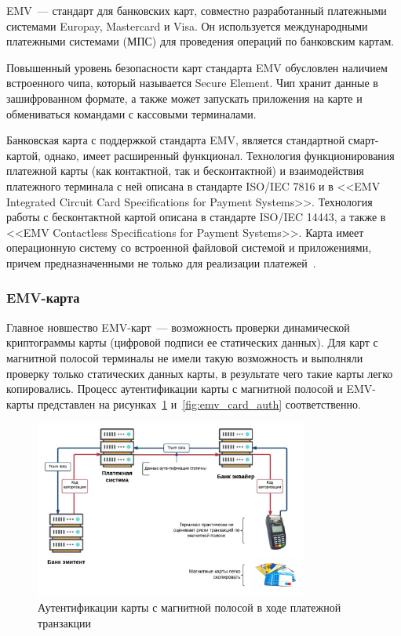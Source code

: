 EMV~--- стандарт для банковских карт, совместно разработанный платежными системами Europay, Mastercard и Visa.
Он используется  международными платежными системами (МПС) для проведения операций по банковским картам.

Повышенный уровень безопасности карт стандарта EMV обусловлен наличием встроенного чипа, который называется Secure Element.
Чип хранит данные в зашифрованном формате, а также может запускать приложения на карте и обмениваться командами с кассовыми терминалами.

Банковская карта с поддержкой стандарта EMV, является стандартной смарт-картой, однако, имеет расширенный функционал.
Технология функционирования платежной карты (как контактной, так и бесконтактной) и взаимодействия платежного терминала с ней описана в стандарте ISO/IEC 7816 и в <<EMV Integrated Circuit Card Specifications for Payment Systems>>.
Технология работы с бесконтактной картой описана в стандарте ISO/IEC 14443, а также в <<EMV Contactless Specifications for Payment Systems>>.
Карта имеет операционную систему со встроенной файловой системой и приложениями, причем предназначенными не только для реализации платежей~\cite{emv_specifications_book}.

\subsubsection{EMV-карта}

Главное новшество EMV-карт~--- возможность проверки динамической криптограммы карты (цифровой подписи ее статических данных).
Для карт с магнитной полосой терминалы не имели такую возможность и выполняли проверку только статических данных карты, в результате чего такие карты легко копировались.
Процесс аутентификации карты с магнитной полосой и EMV-карты представлен на рисунках~\ref{fig:magnetic_card_auth} и~\ref{fig:emv_card_auth} соответственно.

\begin{figure}[H]
    \centering
    \includegraphics[width=0.8\textwidth]{images/research/magnetic_card_auth}
    \caption{\centering Аутентификации карты с магнитной полосой в ходе платежной транзакции}
    \label{fig:magnetic_card_auth}
\end{figure}

